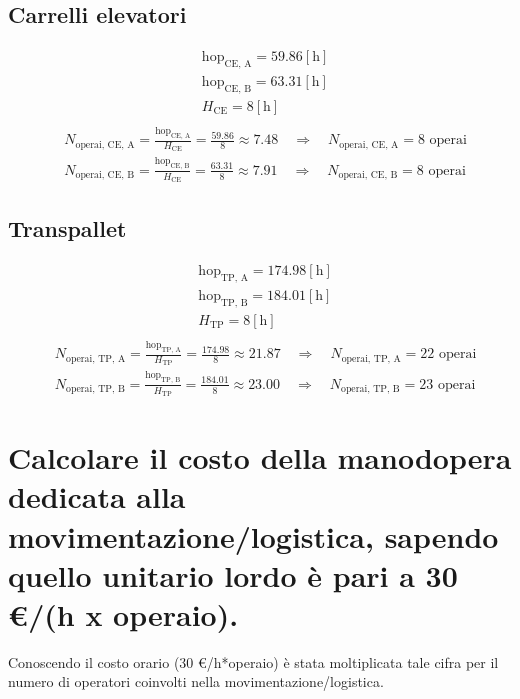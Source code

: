 \documentclass[a4paper,12pt]{article}
\begin{document}
\subsection{Carrelli elevatori}
\begin{align*}
  &\text{hop}_{\text{CE, A}} = 59.86 \left[\mathrm{h}\right] \\
  &\text{hop}_{\text{CE, B}} = 63.31 \left[\mathrm{h}\right] \\
  &H_{\text{CE}} = 8 \left[\mathrm{h}\right] \\
\end{align*}
\begin{align*}
  &N_{\text{operai, CE, A}} = \frac{\text{hop}_{\text{CE, A}}}{H_{\text{CE}}} = \frac{59.86}{8} \approx 7.48 \quad \Rightarrow \quad N_{\text{operai, CE, A}} = 8 \text{ operai} \\
  &N_{\text{operai, CE, B}} = \frac{\text{hop}_{\text{CE, B}}}{H_{\text{CE}}} = \frac{63.31}{8} \approx 7.91 \quad \Rightarrow \quad N_{\text{operai, CE, B}} = 8 \text{ operai}
\end{align*}
\subsection{Transpallet}
\begin{align*}
  &\text{hop}_{\text{TP, A}} = 174.98 \left[\mathrm{h}\right] \\
  &\text{hop}_{\text{TP, B}} = 184.01 \left[\mathrm{h}\right] \\
  &H_{\text{TP}} = 8 \left[\mathrm{h}\right] \\
\end{align*}
\begin{align*}
  &N_{\text{operai, TP, A}} = \frac{\text{hop}_{\text{TP, A}}}{H_{\text{TP}}} = \frac{174.98}{8} \approx 21.87 \quad \Rightarrow \quad N_{\text{operai, TP, A}} = 22 \text{ operai} \\
  &N_{\text{operai, TP, B}} = \frac{\text{hop}_{\text{TP, B}}}{H_{\text{TP}}} = \frac{184.01}{8} \approx 23.00 \quad \Rightarrow \quad N_{\text{operai, TP, B}} = 23 \text{ operai}
\end{align*}
\section{ Calcolare il costo della manodopera dedicata alla movimentazione/logistica, sapendo quello unitario lordo è pari a 30 €/(h x operaio).}
Conoscendo il costo orario (30 €/h*operaio) è stata moltiplicata tale cifra per il numero di operatori coinvolti nella movimentazione/logistica.
\end{document}

